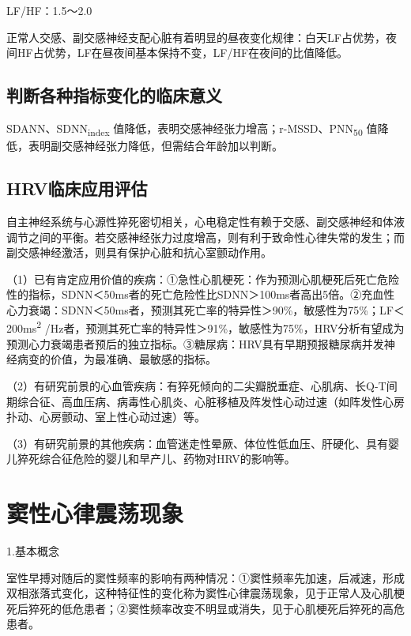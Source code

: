 LF/HF：1.5～2.0

正常人交感、副交感神经支配心脏有着明显的昼夜变化规律：白天LF占优势，夜间HF占优势，LF在昼夜间基本保持不变，LF/HF在夜间的比值降低。

\protect\hypertarget{text00056.htmlux5cux23subid659}{}{}

\subsection{判断各种指标变化的临床意义}

SDANN、SDNN\textsubscript{index}
值降低，表明交感神经张力增高；r-MSSD、PNN\textsubscript{50}
值降低，表明副交感神经张力降低，但需结合年龄加以判断。

\protect\hypertarget{text00056.htmlux5cux23subid660}{}{}

\subsection{HRV临床应用评估}

自主神经系统与心源性猝死密切相关，心电稳定性有赖于交感、副交感神经和体液调节之间的平衡。若交感神经张力过度增高，则有利于致命性心律失常的发生；而副交感神经激活，则具有保护心脏和抗心室颤动作用。

（1）已有肯定应用价值的疾病：①急性心肌梗死：作为预测心肌梗死后死亡危险性的指标，SDNN＜50ms者的死亡危险性比SDNN＞100ms者高出5倍。②充血性心力衰竭：SDNN＜50ms者，预测其死亡率的特异性＞90\%，敏感性为75\%；LF＜200ms\textsuperscript{2}
/Hz者，预测其死亡率的特异性＞91\%，敏感性为75\%，HRV分析有望成为预测心力衰竭患者预后的独立指标。③糖尿病：HRV具有早期预报糖尿病并发神经病变的价值，为最准确、最敏感的指标。

（2）有研究前景的心血管疾病：有猝死倾向的二尖瓣脱垂症、心肌病、长Q-T间期综合征、高血压病、病毒性心肌炎、心脏移植及阵发性心动过速（如阵发性心房扑动、心房颤动、室上性心动过速）等。

（3）有研究前景的其他疾病：血管迷走性晕厥、体位性低血压、肝硬化、具有婴儿猝死综合征危险的婴儿和早产儿、药物对HRV的影响等。

\protect\hypertarget{text00056.htmlux5cux23subid661}{}{}

\section{窦性心律震荡现象}

1.基本概念

室性早搏对随后的窦性频率的影响有两种情况：①窦性频率先加速，后减速，形成双相涨落式变化，这种特征性的变化称为窦性心律震荡现象，见于正常人及心肌梗死后猝死的低危患者；②窦性频率改变不明显或消失，见于心肌梗死后猝死的高危患者。

